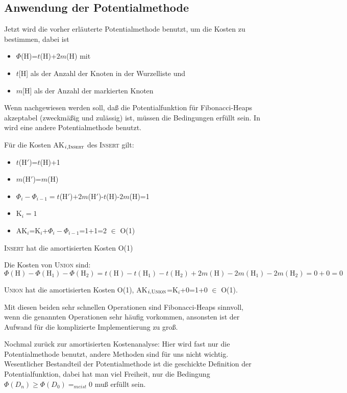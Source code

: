 \subsection{Anwendung der Potentialmethode}
Jetzt wird die vorher erläuterte Potentialmethode benutzt, um die Kosten zu bestimmen, dabei ist
\begin{itemize}
\item $\Phi$(H)=$t$(H)+$2m$(H) mit
\item $t$[H] als der Anzahl der Knoten in der Wurzelliste und
\item $m$[H] als der Anzahl der markierten Knoten
\end{itemize}
Wenn nachgewiesen werden soll, daß die Potentialfunktion für Fibonacci-Heaps akzepta\-bel (zweckmäßig und zulässig)
ist, müssen die Bedingungen erfüllt sein. In \cite{ottmann} wird eine andere Potentialmethode benutzt.

Für die Kosten AK$_{i, \textsc{Insert}}$ des \textsc{Insert} gilt:
\begin{itemize}
\item $t$(H$'$)=$t$(H)+1
\item $m$(H$'$)=$m$(H)
\item ${\Phi}_i-{\Phi}_{i-1}=t$(H$'$)$+2m$(H$'$)-$t$(H)-$2m$(H)=1
\item K$_i=1$
\item AK$_i$=K$_i$+${\Phi}_i-{\Phi}_{i-1}$=1+1=2 $\in$ O(1)
\end{itemize}

\begin{satz}
\textsc{Insert} hat die amortisierten Kosten O(1)
\end{satz}

Die Kosten von \textsc{Union} sind:
\[\Phi(\mbox{H})-\Phi(\mbox{H}_1)-\Phi(\mbox{H}_2)=t(\mbox{H})-t(\mbox{H}_1)-t(\mbox{H}_2)+2m(\mbox{H})-2m(\mbox{H}_1)-
2m(\mbox{H}_2)=0+0=0\]

\begin{satz}
\textsc{Union} hat die amortisierten Kosten O(1), AK$_{i, \textsc{Union}}$=K$_i$+0=1+0 $\in$ O(1).
\end{satz}

Mit diesen beiden sehr schnellen Operationen sind Fibonacci-Heaps sinnvoll, wenn die genannten Operationen sehr häufig
vorkommen, ansonsten ist der Aufwand für die komplizierte Implementierung zu groß.

Nochmal zurück zur amortisierten Kostenanalyse:
Hier wird fast nur die Potentialme\-thode benutzt, andere Methoden sind für uns nicht wichtig. Wesentlicher Bestandteil
der Potentialmethode ist die geschickte Definition der Potentialfunktion, dabei hat man viel Freiheit, nur die Bedingung $\Phi
(D_n) \geq \Phi(D_0)=_{meist}0$ muß erfüllt sein.

